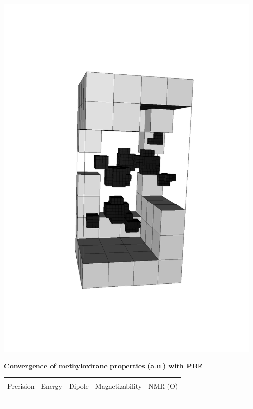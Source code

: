 \begin{frame}
\begin{minipage}{0.5\textwidth}
\includegraphics[angle=-90, scale=0.25, viewport = 170 150 470 700, clip]{figures/methyloxirane_grid.pdf}
\end{minipage}
\begin{table}
    \centering
    \textbf{Convergence of methyloxirane properties (a.u.) with PBE}
    \begin{tabular}{ccccc}
    \hline               
    \hline               
                   &                   &                &                 &                   \\
    Precision      & Energy            & Dipole         & Magnetizability & NMR (O)           \\
    \hspace{10mm}\ & \hspace{20mm}\    & \hspace{20mm}\ & \hspace{20mm}\  & \hspace{20mm}\    \\

\end{tabular}
\end{table}
\end{frame}
